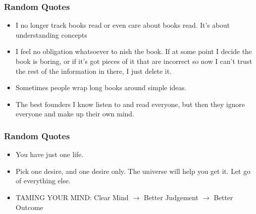 \begin{frame}[fragile]\frametitle{ Random Quotes}

\begin{itemize}
\item I no longer track books read or even care about books read. It’s about
understanding concepts

\item I feel no obligation whatsoever to  nish the book. If at some point I
decide the book is boring, or if it’s got pieces of it that are incorrect so
now I can’t trust the rest of the information in there, I just delete it.

\item Sometimes people wrap long books around simple ideas.

\item The best founders I know listen to and read everyone, but then they
ignore everyone and make up their own mind.
\end{itemize}

\end{frame}

\begin{frame}[fragile]\frametitle{ Random Quotes}

\begin{itemize}
\item You have just one life.
\item Pick one desire, and one desire only. The universe will help
you get it. Let go of everything else.
\item  TAMING YOUR MIND: Clear Mind $\rightarrow$ Better Judgement $\rightarrow$ Better
Outcome
\end{itemize}

\end{frame}